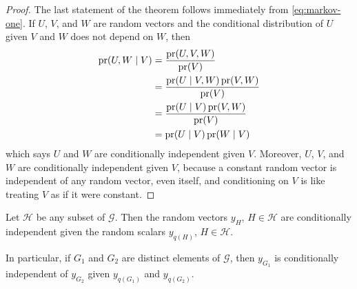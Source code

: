 \begin{proof}
The last statement of the theorem follows immediately from
\eqref{eq:markov-one}.  If $U$, $V$, and $W$ are random vectors
and the conditional distribution of $U$ given $V$ and $W$ does not depend
on $W$, then
\begin{align*}
   \operatorname{pr}(U, W \mid V)
   & =
   \frac{\operatorname{pr}(U, V, W)}{\operatorname{pr}(V)}
   \\
   & =
   \frac{\operatorname{pr}(U \mid V, W) \operatorname{pr}(V, W)}{\operatorname{pr}(V)}
   \\
   & =
   \frac{\operatorname{pr}(U \mid V) \operatorname{pr}(V, W)}{\operatorname{pr}(V)}
   \\
   & =
   \operatorname{pr}(U \mid V) \operatorname{pr}(W \mid V)
\end{align*}
which says $U$ and $W$ are conditionally independent given $V$.
Moreover, $U$, $V$, and $W$ are conditionally independent given $V$,
because a constant random vector is independent of any random vector,
even itself, and conditioning on $V$ is like treating $V$ as if it
were constant.
\end{proof}

\begin{theorem} \label{th:markov-two}
Let $\mathcal{H}$ be any subset of $\mathcal{G}$.  Then the random vectors
$y_H$, $H \in \mathcal{H}$ are conditionally independent given
the random scalars $y_{q(H)}$, $H \in \mathcal{H}$.
\end{theorem}
In particular, if $G_1$ and $G_2$ are distinct elements of $\mathcal{G}$,
then $y_{G_1}$ is conditionally independent of $y_{G_2}$
given $y_{q(G_1)}$ and $y_{q(G_2)}$.

